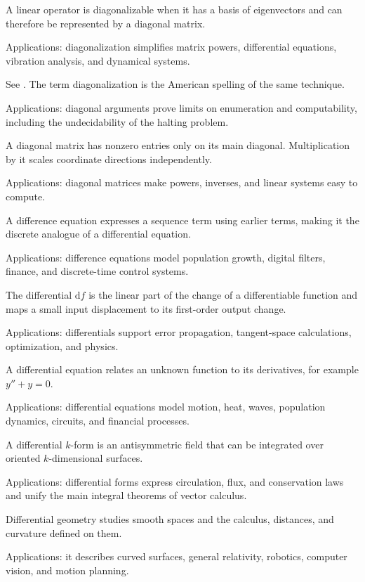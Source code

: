 A linear operator is diagonalizable when it has a basis of eigenvectors and can therefore be represented by a diagonal matrix. \par\noindent Applications: diagonalization simplifies matrix powers, differential equations, vibration analysis, and dynamical systems.

See . The term diagonalization is the American spelling of the same technique. \par\noindent Applications: diagonal arguments prove limits on enumeration and computability, including the undecidability of the halting problem.

A diagonal matrix has nonzero entries only on its main diagonal. Multiplication by it scales coordinate directions independently. \par\noindent Applications: diagonal matrices make powers, inverses, and linear systems easy to compute.

A difference equation expresses a sequence term using earlier terms, making it the discrete analogue of a differential equation. \par\noindent Applications: difference equations model population growth, digital filters, finance, and discrete-time control systems.

The differential $\mathrm df$ is the linear part of the change of a differentiable function and maps a small input displacement to its first-order output change. \par\noindent Applications: differentials support error propagation, tangent-space calculations, optimization, and physics.

A differential equation relates an unknown function to its derivatives, for example $y''+y=0$. \par\noindent Applications: differential equations model motion, heat, waves, population dynamics, circuits, and financial processes.

A differential $k$-form is an antisymmetric field that can be integrated over oriented $k$-dimensional surfaces. \par\noindent Applications: differential forms express circulation, flux, and conservation laws and unify the main integral theorems of vector calculus.

Differential geometry studies smooth spaces and the calculus, distances, and curvature defined on them. \par\noindent Applications: it describes curved surfaces, general relativity, robotics, computer vision, and motion planning.

